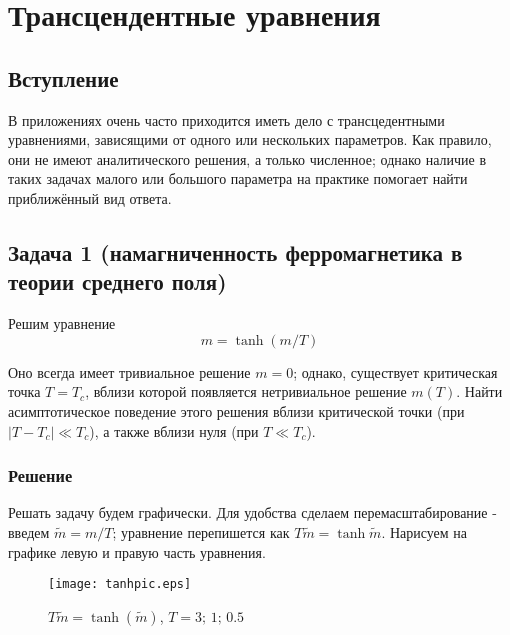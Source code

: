 \documentclass[a4paper,12pt]{article}
\begin{document}
\section*{Трансцендентные уравнения}

\subsection*{Вступление}

В приложениях очень часто приходится иметь дело с трансцедентными
уравнениями, зависящими от одного или нескольких параметров. Как правило,
они не имеют аналитического решения, а только численное; однако наличие
в таких задачах малого или большого параметра на практике помогает
найти приближённый вид ответа.


\subsection*{Задача 1 (намагниченность ферромагнетика в теории среднего поля)}

Решим уравнение 
\[
m=\tanh(m/T)
\]


\noindent
Оно всегда имеет тривиальное решение $m=0$; однако, существует критическая
точка $T=T_{c}$, вблизи которой появляется нетривиальное решение
$m(T)$. Найти асимптотическое поведение этого решения вблизи критической
точки (при $\left|T-T_{c}\right|\ll T_{c}$), а также вблизи нуля
(при $T\ll T_{c}$).


\subsubsection*{Решение}

Решать задачу будем графически. Для удобства сделаем перемасштабирование
- введем $\tilde{m}=m/T$; уравнение перепишется как $T\tilde{m}=\tanh\tilde{m}$.
Нарисуем на графике левую и правую часть уравнения.

\begin{figure}[h]
	\caption{$T\tilde{m}=\tanh(\tilde{m})$, $T=3;\,1;\,0.5$}
	\centering
	\texttt{[image: tanhpic.eps]}
\end{figure}
\end{document}
